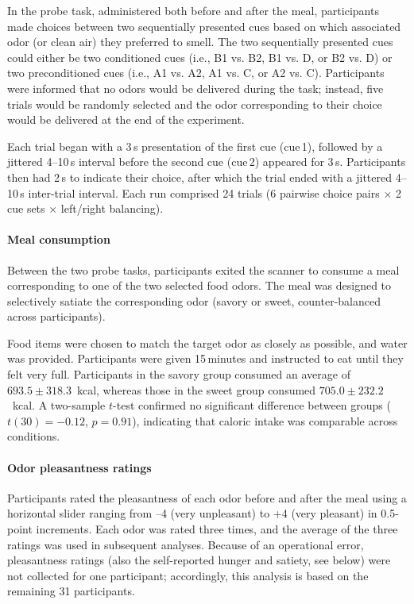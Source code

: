 \documentclass[12pt,letterpaper]{article}
\begin{document}
In the probe task, administered both before and after the meal, participants made choices between two sequentially presented cues based on which associated odor (or clean air) they preferred to smell. The two sequentially presented cues could either be two conditioned cues (i.e., B1 vs. B2, B1 vs. D, or B2 vs. D) or two preconditioned cues (i.e., A1 vs. A2, A1 vs. C, or A2 vs. C). Participants were informed that no odors would be delivered during the task; instead, five trials would be randomly selected and the odor corresponding to their choice would be delivered at the end of the experiment.


Each trial began with a 3\,s presentation of the first cue (cue\,1), followed by a jittered 4--10\,s interval before the second cue (cue\,2) appeared for 3\,s. Participants then had 2\,s to indicate their choice, after which the trial ended with a jittered 4--10\,s inter-trial interval. Each run comprised 24 trials (6 pairwise choice pairs $\times$ 2 cue sets $\times$ left/right balancing).




\paragraph*{Meal consumption}

Between the two probe tasks, participants exited the scanner to consume a meal corresponding to one of the two selected food odors. The meal was designed to selectively satiate the corresponding odor (savory or sweet, counter-balanced across participants). 

Food items were chosen to match the target odor as closely as possible, and water was provided. Participants were given 15\,minutes and instructed to eat until they felt very full. Participants in the savory group consumed an average of $693.5 \pm 318.3$~kcal, whereas those in the sweet group consumed $705.0 \pm 232.2$~kcal. A two-sample $t$-test confirmed no significant difference between groups ($t(30) = -0.12$, $p = 0.91$), indicating that caloric intake was comparable across conditions.


\paragraph*{Odor pleasantness ratings}

Participants rated the pleasantness of each odor before and after the meal using a horizontal slider ranging from –4 (very unpleasant) to +4 (very pleasant) in 0.5-point increments. Each odor was rated three times, and the average of the three ratings was used in subsequent analyses. Because of an operational error, pleasantness ratings (also the self-reported hunger and satiety, see below) were not collected for one participant; accordingly, this analysis is based on the remaining 31 participants.
\end{document}

